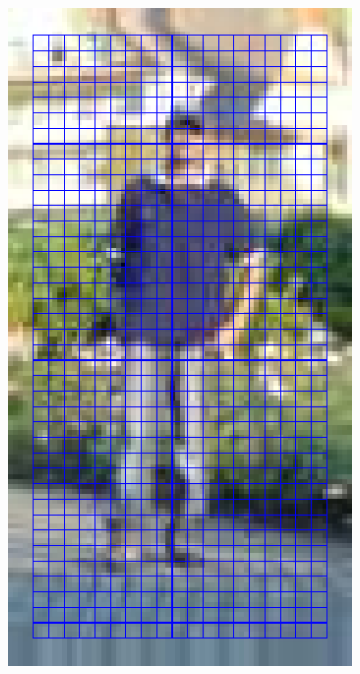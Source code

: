 \documentclass[thesis.tex]{subfiles}
\begin{document}
\begin{figure}[tb]
{\begin{subfigure}[t]{0.17\textwidth}
	\end{subfigure}
	\begin{subfigure}[t]{0.17\textwidth}
		\includegraphics[width=\textwidth]{img/inriaExampleCells.pdf}
		\caption{}
		\label{fig:inriaExampleCells}
		\vspace{2mm}
	\end{subfigure}
}
\end{figure}
\end{document}
